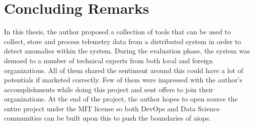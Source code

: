 \section{Concluding Remarks}

In this thesis, the author proposed a collection of tools that can be used to collect, store and process telemetry data from a distributed system in order to detect anomalies within the system. During the evaluation phase, the system was demoed to a number of technical experts from both local and foreign organizations. All of them shared the sentiment around this could have a lot of potentials if marketed correctly. Few of them were impressed with the author's accomplishments while doing this project and sent offers to join their organizations. At the end of the project, the author hopes to open source the entire project under the MIT license so both DevOps and Data Science communities can be built upon this to push the boundaries of \ac{aiops}.